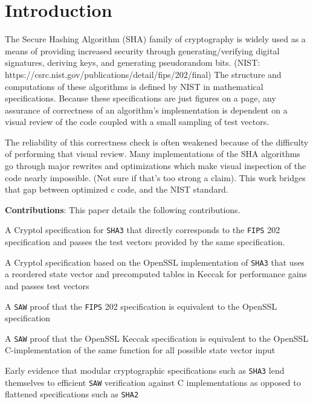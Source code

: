 \section{Introduction}\label{sec:introduction}
  The Secure Hashing Algorithm (SHA) family of cryptography is widely used as a means of providing increased security through generating/verifying digital signatures, deriving keys, and generating pseudorandom bits. (NIST: https://csrc.nist.gov/publications/detail/fips/202/final)  
  The structure and computations of these algorithms is defined by NIST in mathematical specifications.  
  Because these specifications are just figures on a page, any assurance of correctness of an algorithm’s implementation is dependent on a visual review of the code coupled with a small sampling of test vectors.
  
  The reliability of this correctness check is often weakened because of the difficulty of performing that visual review.  
  Many implementations of the SHA algorithms go through major rewrites and optimizations which make visual inspection of the code nearly impossible. (Not sure if that’s too strong a claim).
  This work bridges that gap between optimized c code, and the NIST standard.

\noindent \textbf{Contributions}:
This paper details the following contributions.
\begin{compactitem}
  \item  A Cryptol specification for \texttt{SHA3} that directly corresponds to the \texttt{FIPS} 202 specification and passes the test vectors provided by the same specification.
  \item A Cryptol specification based on the OpenSSL implementation of \texttt{SHA3} that uses a reordered state vector and precomputed tables in Keccak for performance gains and passes test vectors
  \item A \texttt{SAW} proof that the \texttt{FIPS} 202 specification is equivalent to the OpenSSL specification
  \item A \texttt{SAW} proof that the OpenSSL Keccak specification is equivalent to the OpenSSL C-implementation of the same function for all possible state vector input
  \item Early evidence that modular cryptographic specifications such as \texttt{SHA3} lend themselves to efficient \texttt{SAW} verification against C implementations as opposed to flattened specifications such as \texttt{SHA2} 
\end{compactitem}

